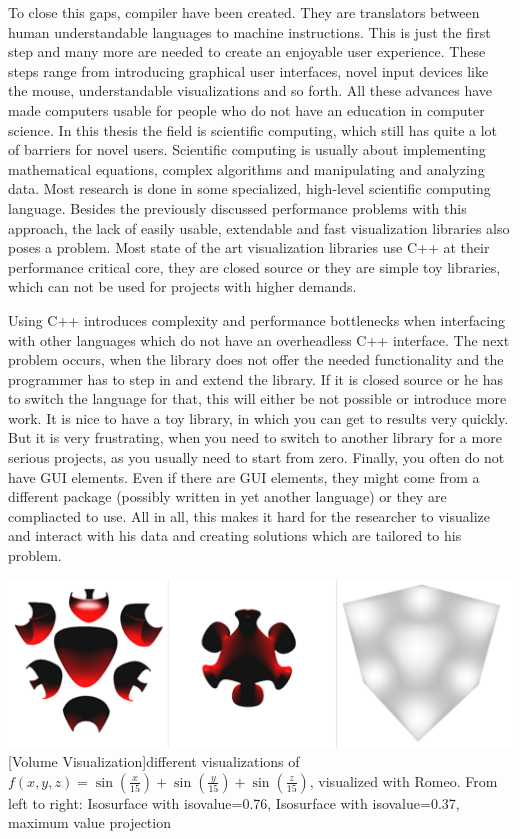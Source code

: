 To close this gaps, compiler have been created. They are translators between human understandable languages to machine instructions.
This is just the first step and many more are needed to create an enjoyable user experience.
These steps range from introducing graphical user interfaces, novel input devices like the mouse, understandable visualizations and so forth.
All these advances have made computers usable for people who do not have an education in computer science.
In this thesis the field is scientific computing, which still has quite a lot of barriers for novel users.
Scientific computing is usually about implementing mathematical equations, complex algorithms and manipulating and analyzing data.
Most research is done in some specialized, high-level scientific computing language.
Besides the previously discussed performance problems with this approach, the lack of easily usable, extendable and fast visualization libraries also poses a problem.
Most state of the art visualization libraries use C++ at their performance critical core, they are closed source or they are simple toy libraries, which can not be used for projects with higher demands.

Using C++ introduces complexity and performance bottlenecks when interfacing with other languages which do not have an overheadless C++ interface. 
The next problem occurs, when the library does not offer the needed functionality and the programmer has to step in and extend the library. If it is closed source or he has to switch the language for that, this will either be not possible or introduce more work. 
It is nice to have a toy library, in which you can get to results very quickly. But it is very frustrating, when you need to switch to another library for a more serious projects, as you usually need to start from zero.
Finally, you often do not have GUI elements. 
Even if there are GUI elements, they might come from a different package (possibly written in yet another language) or they are compliacted to use.
All in all, this makes it hard for the researcher to visualize and interact with his data and creating solutions which are tailored to his problem.

\vspace{1em}
\begin{minipage}{\linewidth}
    \centering
    \includegraphics[width=0.7\linewidth]{graphics/surfaces.png}
    [Volume Visualization]{different visualizations of $f(x,y,z)=\sin(\frac{x}{15})+\sin(\frac{y}{15})+\sin(\frac{z}{15})$, visualized with Romeo. From left to right: Isosurface with isovalue=0.76, Isosurface with isovalue=0.37, maximum value projection}
    \label{fig:volume}
\end{minipage}
\vspace{1em}


